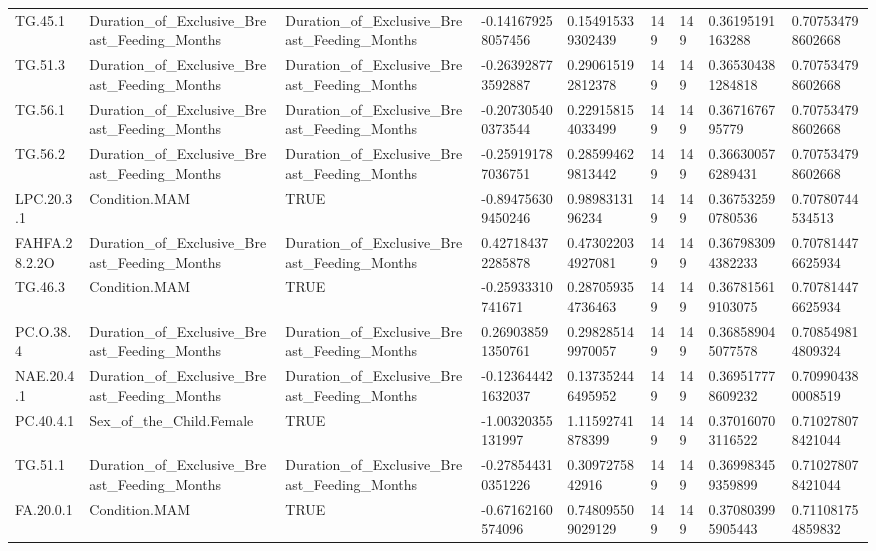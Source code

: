 \begin{longtable}{lllllllll}
TG.45.1 & Duration\_of\_Exclusive\_Breast\_Feeding\_Months & Duration\_of\_Exclusive\_Breast\_Feeding\_Months & -0.141679258057456 & 0.154915339302439 & 149 & 149 & 0.36195191163288 & 0.707534798602668 \\
TG.51.3 & Duration\_of\_Exclusive\_Breast\_Feeding\_Months & Duration\_of\_Exclusive\_Breast\_Feeding\_Months & -0.263928773592887 & 0.290615192812378 & 149 & 149 & 0.365304381284818 & 0.707534798602668 \\
TG.56.1 & Duration\_of\_Exclusive\_Breast\_Feeding\_Months & Duration\_of\_Exclusive\_Breast\_Feeding\_Months & -0.207305400373544 & 0.229158154033499 & 149 & 149 & 0.3671676795779 & 0.707534798602668 \\
TG.56.2 & Duration\_of\_Exclusive\_Breast\_Feeding\_Months & Duration\_of\_Exclusive\_Breast\_Feeding\_Months & -0.259191787036751 & 0.285994629813442 & 149 & 149 & 0.366300576289431 & 0.707534798602668 \\
LPC.20.3.1 & Condition.MAM & TRUE & -0.894756309450246 & 0.9898313196234 & 149 & 149 & 0.367532590780536 & 0.70780744534513 \\
FAHFA.28.2.2O & Duration\_of\_Exclusive\_Breast\_Feeding\_Months & Duration\_of\_Exclusive\_Breast\_Feeding\_Months & 0.427184372285878 & 0.473022034927081 & 149 & 149 & 0.367983094382233 & 0.707814476625934 \\
TG.46.3 & Condition.MAM & TRUE & -0.25933310741671 & 0.287059354736463 & 149 & 149 & 0.367815619103075 & 0.707814476625934 \\
PC.O.38.4 & Duration\_of\_Exclusive\_Breast\_Feeding\_Months & Duration\_of\_Exclusive\_Breast\_Feeding\_Months & 0.269038591350761 & 0.298285149970057 & 149 & 149 & 0.368589045077578 & 0.708549814809324 \\
NAE.20.4.1 & Duration\_of\_Exclusive\_Breast\_Feeding\_Months & Duration\_of\_Exclusive\_Breast\_Feeding\_Months & -0.123644421632037 & 0.137352446495952 & 149 & 149 & 0.369517778609232 & 0.709904380008519 \\
PC.40.4.1 & Sex\_of\_the\_Child.Female & TRUE & -1.00320355131997 & 1.11592741878399 & 149 & 149 & 0.370160703116522 & 0.710278078421044 \\
TG.51.1 & Duration\_of\_Exclusive\_Breast\_Feeding\_Months & Duration\_of\_Exclusive\_Breast\_Feeding\_Months & -0.278544310351226 & 0.3097275842916 & 149 & 149 & 0.369983459359899 & 0.710278078421044 \\
FA.20.0.1 & Condition.MAM & TRUE & -0.67162160574096 & 0.748095509029129 & 149 & 149 & 0.370803995905443 & 0.711081754859832 \\

\end{longtable}
